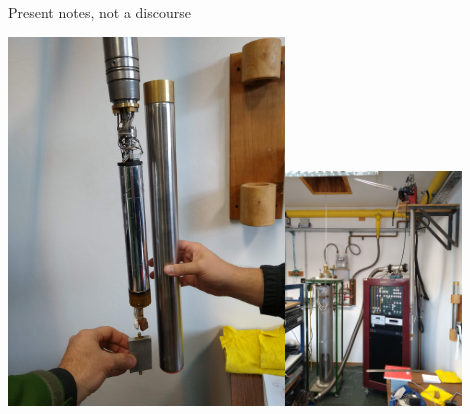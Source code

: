 \documentclass[ignorenonframetext,12pt]{beamer}
\begin{document}
\begin{frame}{Present notes, not a discourse}
\begin{center}
				\hspace{10mm}\includegraphics[width=0.55\textwidth]{IMG_20190523_105443289}\hspace{2mm}\includegraphics[width=0.35\textwidth]{IMG_20190523_105117465}
\end{center}


%
%
%
%
\end{frame}
\end{document}
